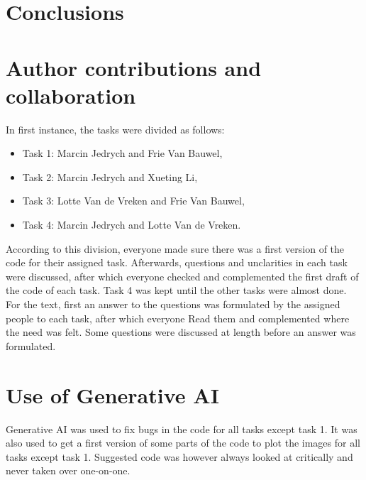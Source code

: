 \documentclass[conference]{IEEEtran}
\begin{document}
\section{Conclusions}\label{sec:conclusion}

\section{Author contributions and collaboration}\label{sec:author_contributions}
In first instance, the tasks were divided as follows:
\begin{itemize}
	\item Task 1: Marcin Jedrych and Frie Van Bauwel, 
	\item Task 2: Marcin Jedrych and Xueting Li,
	\item Task 3: Lotte Van de Vreken and Frie Van Bauwel,
	\item Task 4: Marcin Jedrych and Lotte Van de Vreken.
\end{itemize}

According to this division, everyone made sure there was a first version of the code for their assigned task. Afterwards, questions and unclarities in each task were discussed, after which everyone checked and complemented the first draft of the code of each task. Task 4 was kept until the other tasks were almost done. For the text, first an answer to the questions was formulated by the assigned people to each task, after which everyone Read them and complemented where the need was felt. Some questions were discussed at length before an answer was formulated.

\section{Use of Generative AI}\label{sec:generative_AI}
Generative AI was used to fix bugs in the code for all tasks except task 1. It was also used to get a first version of some parts of the code to plot the images for all tasks except task 1. Suggested code was however always looked at critically and never taken over one-on-one.
\end{document}
